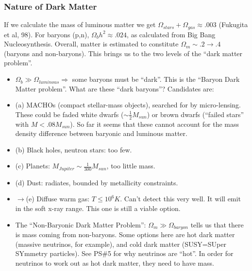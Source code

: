 \documentclass{article}
\def\hf{\frac12}
\def\imply{\Rightarrow}
\def\inv#1{\frac{1}{ #1}}
\def\hf{\frac12}
\def\imply{\Rightarrow}
\begin{document}
\subsubsection*{ Nature of Dark Matter }
If we calculate the mass of luminous matter we get 
$\Omega_{stars}+\Omega_{gas}\approx .003$ (Fukugita et al, 98).  For baryons
(p,n), $\Omega_bh^2\approx .024$, as calculated from Big Bang Nucleosynthesis.
Overall, matter is estimated to constitute $\Omega_m\sim.2\to.4$ (baryons and
non-baryons).  This brings us to the two levels of the ``dark matter problem''.
\begin{itemize}
\item $\Omega_b\gg \Omega_{luminous}\imply$ some baryons must be ``dark''.
This is the ``Baryon Dark Matter problem''.  What are these ``dark baryons''?
Candidates are:
\item{(a)} MACHOs (compact stellar-mass objects), searched for by 
micro-lensing.  These could be faded white dwarfs ($\sim\hf M_{sun}$) or 
brown dwarfs (``failed stars'' with $M<.08M_{sun}$).  So far it seems that 
these cannot account for the mass density difference between baryonic 
and luminous matter.
\item{(b)} Black holes, neutron stars: too few.
\item{(c)} Planets: $M_{Jupiter}\sim\inv{300}M_{sun}$, too little mass.
\item{(d)} Dust: radiates, bounded by metallicity constraints.
\item{$\to$(e)} Diffuse warm gas: $T\le10^6K$.  Can't detect this very well.
It will emit in the soft x-ray range.  This one is still a viable option.
\item The ``Non-Baryonic Dark Matter Problem'': $\Omega_m\gg \Omega_{baryon}$
tells us that there is mass coming from non-baryons.  Some options here are
hot dark matter (massive neutrinos, for example), and cold dark matter
(SUSY=SUper SYmmetry particles).  
See PS\#5 for why neutrinos are ``hot''.
In order for neutrinos to work out as hot dark matter, they need to have mass.
\end{itemize}
\end{document}
